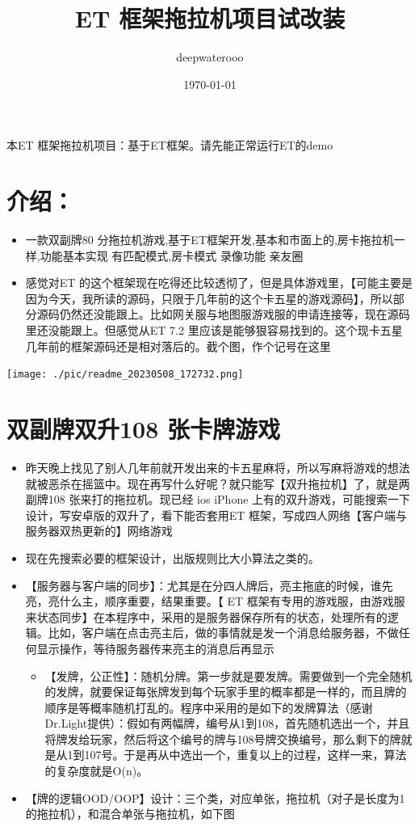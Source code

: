 \documentclass[9pt, b5paper]{article}
\author{deepwaterooo}
\date{\today}
\title{ET 框架拖拉机项目试改装}
\begin{document}
\maketitle
\tableofcontents

本ET 框架拖拉机项目：基于ET框架。请先能正常运行ET的demo  

\section{介绍：}
\label{sec:org58d1477}
\begin{itemize}
\item 一款双副牌80 分拖拉机游戏,基于ET框架开发,基本和市面上的,房卡拖拉机一样,功能基本实现 有匹配模式,房卡模式 录像功能 亲友圈
\item 感觉对ET 的这个框架现在吃得还比较透彻了，但是具体游戏里，【可能主要是因为今天，我所读的源码，只限于几年前的这个卡五星的游戏源码】，所以部分源码仍然还没能跟上。比如网关服与地图服游戏服的申请连接等，现在源码里还没能跟上。但感觉从ET 7.2 里应该是能够狠容易找到的。这个现卡五星几年前的框架源码还是相对落后的。截个图，作个记号在这里
\end{itemize}

\begin{center}
\texttt{[image: ./pic/readme\_20230508\_172732.png]}
\end{center}

\section{双副牌双升108 张卡牌游戏}
\label{sec:org42ca8a9}
\begin{itemize}
\item 昨天晚上找见了别人几年前就开发出来的卡五星麻将，所以写麻将游戏的想法就被恶杀在摇篮中。现在再写什么好呢？就只能写【双升拖拉机】了，就是两副牌108 张来打的拖拉机。现已经 ios iPhone 上有的双升游戏，可能搜索一下设计，写安卓版的双升了，看下能否套用ET 框架，写成四人网络【客户端与服务器双热更新的】网络游戏
\item 现在先搜索必要的框架设计，出版规则比大小算法之类的。
\item 【服务器与客户端的同步】：尤其是在分四人牌后，亮主拖底的时候，谁先亮，亮什么主，顺序重要，结果重要。【 ET 框架有专用的游戏服，由游戏服来状态同步】在本程序中，采用的是服务器保存所有的状态，处理所有的逻辑。比如，客户端在点击亮主后，做的事情就是发一个消息给服务器，不做任何显示操作，等待服务器传来亮主的消息后再显示
\begin{itemize}
\item 【发牌，公正性】：随机分牌。第一步就是要发牌。需要做到一个完全随机的发牌，就要保证每张牌发到每个玩家手里的概率都是一样的，而且牌的顺序是等概率随机打乱的。程序中采用的是如下的发牌算法（感谢Dr.Light提供）：假如有两幅牌，编号从1到108，首先随机选出一个，并且将牌发给玩家，然后将这个编号的牌与108号牌交换编号，那么剩下的牌就是从1到107号。于是再从中选出一个，重复以上的过程，这样一来，算法的复杂度就是O(n)。
\end{itemize}
\item 【牌的逻辑OOD/OOP】设计：三个类，对应单张，拖拉机（对子是长度为1 的拖拉机），和混合单张与拖拉机，如下图
\end{itemize}
\end{document}
